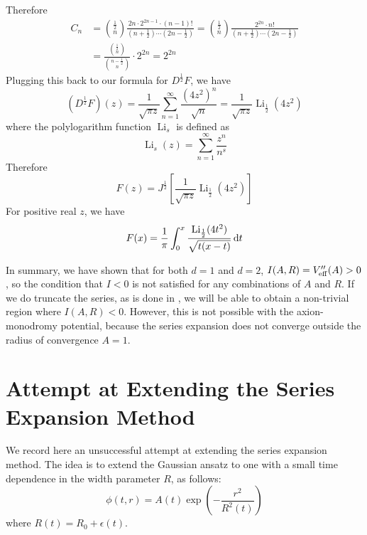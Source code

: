 \documentclass{report}
\DeclareMathOperator{\Li}{Li}
\begin{document}
Therefore
\begin{equation}
  \begin{split}
    C_n &= \binom{\frac{1}{2}}{n}\frac{2n\cdot 2^{2n-1} \cdot(n-1)!}{\left(n+\frac{1}{2}\right)\cdots\left(2n-\frac{1}{2}\right)} = \binom{\frac{1}{2}}{n}\frac{2^{2n}\cdot n!}{\left(n+\frac{1}{2}\right)\cdots\left(2n-\frac{1}{2}\right)}\\
    &=\frac{\binom{\frac{1}{2}}{n}}{\binom{n-\frac{1}{2}}{n}}\cdot2^{2n} = 2^{2n}
  \end{split}
\end{equation}
Plugging this back to our formula for $D^\frac{1}{2}F$, we have
\begin{equation}
  (D^\frac{1}{2}F)(z) = \frac{1}{\sqrt{\pi z}} \sum^\infty_{n=1} \frac{(4z^2)^n}{\sqrt{n}} = \frac{1}{\sqrt{\pi z}}\Li_{\frac{1}{2}}(4z^2)
\end{equation}
where the polylogarithm function $\Li_s$ is defined as
\begin{equation}
  \Li_s(z) = \sum^\infty_{n=1}\frac{z^n}{n^s}
\end{equation}
Therefore
\begin{equation}
  F(z) = J^\frac{1}{2}\left[\frac{1}{\sqrt{\pi z}}\Li_{\frac{1}{2}}(4z^2)\right]
\end{equation}
For positive real $z$, we have
\begin{equation}
  F(x) = \frac{1}{\pi}\int^x_0\frac{\Li_{\frac{1}{2}}(4t^2)}{\sqrt{t(x-t)}}\,{\rm d}t
\end{equation}

\bigbreak

In summary, we have shown that for both $d=1$ and $d=2$, $I(A,R) = V''_{\rm eff}(A) > 0$, so the condition that $I<0$ is not satisfied for any combinations of $A$ and $R$. If we do truncate the series, as is done in \cite{Gleiser:2008ty}, we will be able to obtain a non-trivial region where $I(A,R)<0$. However, this is not possible with the axion-monodromy potential, because the series expansion does not converge outside the radius of convergence $A = 1$.

\section{Attempt at Extending the Series Expansion Method}
We record here an unsuccessful attempt at extending the series expansion method. The idea is to extend the Gaussian ansatz to one with a small time dependence in the width parameter $R$, as follows:
\begin{equation}
  \phi(t,r) = A(t) \exp \left(-\frac{r^2}{R^2(t)}\right )
\end{equation}
where $R(t) = R_0 + \epsilon(t)$.
\end{document}
